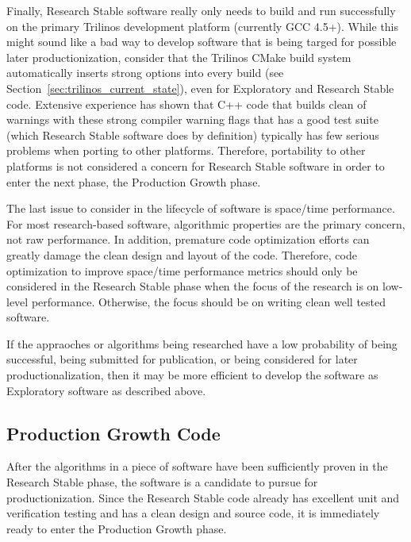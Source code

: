 \documentclass[11pt]{SANDreport}
\begin{document}
Finally, Research Stable software really only needs to build and run
successfully on the primary Trilinos development platform (currently
GCC 4.5+).  While this might sound like a bad way to develop software
that is being targed for possible later productionization, consider
that the Trilinos CMake build system automatically inserts strong
options into every build (see
Section~\ref{sec:trilinos_current_state}), even for Exploratory and
Research Stable code.  Extensive experience has shown that C++ code
that builds clean of warnings with these strong compiler warning flags
that has a good test suite (which Research Stable software does by
definition) typically has few serious problems when porting to other
platforms.  Therefore, portability to other platforms is not
considered a concern for Research Stable software in order to enter
the next phase, the Production Growth phase.

The last issue to consider in the lifecycle of software is space/time
performance.  For most research-based software, algorithmic properties
are the primary concern, not raw performance.  In addition, premature
code optimization efforts can greatly damage the clean design and
layout of the code.  Therefore, code optimization to improve
space/time performance metrics should only be considered in the
Research Stable phase when the focus of the research is on low-level
performance.  Otherwise, the focus should be on writing clean well
tested software.

If the appraoches or algorithms being researched have a low
probability of being successful, being submitted for publication, or
being considered for later productionalization, then it may be more
efficient to develop the software as Exploratory software as described
above.


%
{}\subsection{Production Growth Code}
%

After the algorithms in a piece of software have been sufficiently
proven in the Research Stable phase, the software is a candidate to
pursue for productionization.  Since the Research Stable code already
has excellent unit and verification testing and has a clean design and
source code, it is immediately ready to enter the Production Growth
phase.
\end{document}
